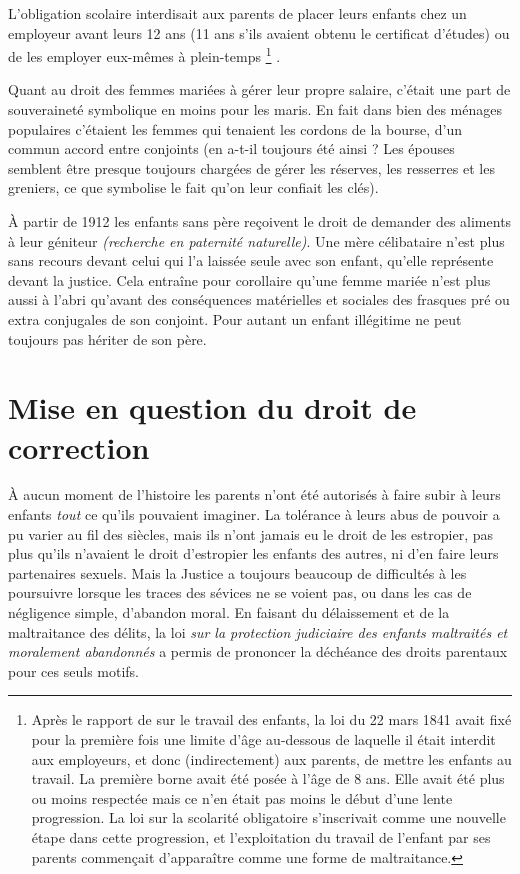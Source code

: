  L'obligation scolaire interdisait aux parents de placer leurs enfants chez un employeur avant leurs 12 ans (11 ans s'ils avaient obtenu le certificat d'études) ou de les employer eux-mêmes à plein-temps%
\footnote{Après le rapport de  sur le travail des enfants, la loi du 22 mars 1841 avait fixé pour la première fois une limite d'âge au-dessous de laquelle il était interdit aux employeurs, et donc (indirectement) aux parents, de mettre les enfants au travail. La première borne avait été posée à l'âge de 8 ans. Elle avait été plus ou moins respectée mais ce n'en était pas moins le début d'une lente progression. La loi sur la scolarité obligatoire s'inscrivait comme une nouvelle étape dans cette progression, et l'exploitation du travail de l'enfant par ses parents commençait d'apparaître comme une forme de maltraitance.}%
. 

 Quant au droit des femmes mariées à gérer leur propre salaire, c'était une part de souveraineté symbolique en moins pour les maris. En fait dans bien des ménages populaires c'étaient les femmes qui tenaient les cordons de la bourse, d'un commun accord entre conjoints (en a-t-il toujours été ainsi ? Les épouses semblent être presque toujours chargées de gérer les réserves, les resserres et les greniers, ce que symbolise le fait qu'on leur confiait les clés).

 À partir de 1912 les enfants sans père reçoivent le droit de demander des aliments à leur géniteur \emph{(recherche en paternité naturelle)}. Une mère célibataire n'est plus sans recours devant celui qui l'a laissée seule avec son enfant, qu'elle représente devant la justice. Cela entraîne pour corollaire qu'une femme mariée n'est plus aussi à l'abri qu'avant des conséquences matérielles et sociales des frasques pré ou extra conjugales de son conjoint. Pour autant un enfant illégitime ne peut toujours pas hériter de son père. 


\section{Mise en question du droit de correction}

 À aucun moment de l'histoire les parents n'ont été autorisés à faire subir à leurs enfants \emph{tout} ce qu'ils pouvaient imaginer. La tolérance à leurs abus de pouvoir a pu varier au fil des siècles, mais ils n'ont jamais eu le droit de les estropier, pas plus qu'ils n'avaient le droit d'estropier les enfants des autres, ni d'en faire leurs partenaires sexuels. Mais la Justice a toujours beaucoup de difficultés à les poursuivre lorsque les traces des sévices ne se voient pas, ou dans les cas de négligence simple, d'abandon moral. En faisant du délaissement et de la maltraitance des délits, la loi {\emph{sur la protection judiciaire des enfants maltraités et moralement abandonnés}} a permis de prononcer la déchéance des droits parentaux pour ces seuls motifs. 

